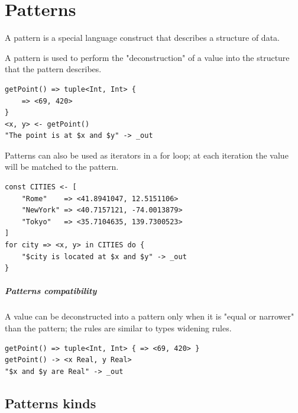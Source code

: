 \chapter{Patterns}
\label{ch:patterns}

A pattern is a special language construct that describes a structure of data.

A pattern is used to perform the "deconstruction" of a value into the structure
that the pattern describes.

\begin{verbatim}
getPoint() => tuple<Int, Int> {
	=> <69, 420>
}
<x, y> <- getPoint()
"The point is at $x and $y" -> _out
\end{verbatim}

Patterns can also be used as iterators in a for loop; at each iteration the
value will be matched to the pattern.

\begin{verbatim}
const CITIES <- [
	"Rome"    => <41.8941047, 12.5151106>
	"NewYork" => <40.7157121, -74.0013879>
	"Tokyo"   => <35.7104635, 139.7300523>
]
for city => <x, y> in CITIES do {
	"$city is located at $x and $y" -> _out
}
\end{verbatim}

\paragraph{Patterns compatibility} A value can be deconstructed into a pattern
only when it is "equal or narrower" than the pattern; the rules are similar to
types widening rules.


\begin{verbatim}
getPoint() => tuple<Int, Int> { => <69, 420> }
getPoint() -> <x Real, y Real>
"$x and $y are Real" -> _out
\end{verbatim}

\clearpage

\section{Patterns kinds}

